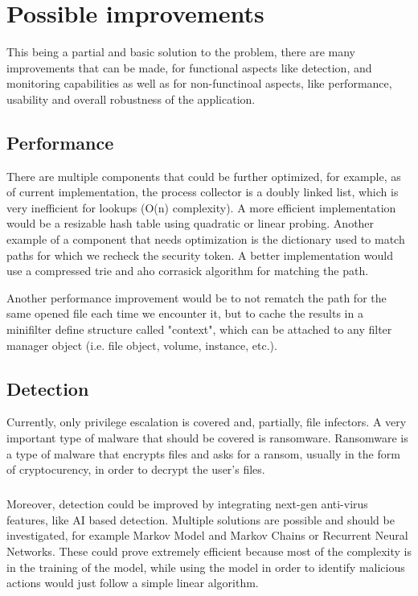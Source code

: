 \chapter{Possible improvements}
    This being a partial and basic solution to the problem, there are many improvements that can be made, for functional aspects like detection,
    and monitoring capabilities as well as for non-functinoal aspects, like performance, usability and overall robustness of the application.

    \section{Performance}
        There are multiple components that could be further optimized, for example, as of current implementation, the process collector is
        a doubly linked list, which is very inefficient for lookups (O(n) complexity). A more efficient implementation would be a resizable hash
        table using quadratic or linear probing. Another example of a component that needs optimization is the dictionary used to match paths
        for which we recheck the security token. A better implementation would use a compressed trie and aho corrasick algorithm for matching
        the path.

        Another performance improvement would be to not rematch the path for the same opened file each time we encounter it, but to cache
        the results in a minifilter define structure called "context", which can be attached to any filter manager object (i.e. file object, 
        volume, instance, etc.).

    \section{Detection}
        Currently, only privilege escalation is covered and, partially, file infectors. A very important type of malware that should be covered
        is ransomware. Ransomware is a type of malware that encrypts files and asks for a ransom, usually in the form of cryptocurency, in order
        to decrypt the user's files.

        \paragraph{}
        Moreover, detection could be improved by integrating next-gen anti-virus features, like AI based detection. Multiple solutions are
        possible and should be investigated, for example Markov Model and Markov Chains or Recurrent Neural Networks. These could prove extremely
        efficient because most of the complexity is in the training of the model, while using the model in order to identify malicious actions
        would just follow a simple linear algorithm.

